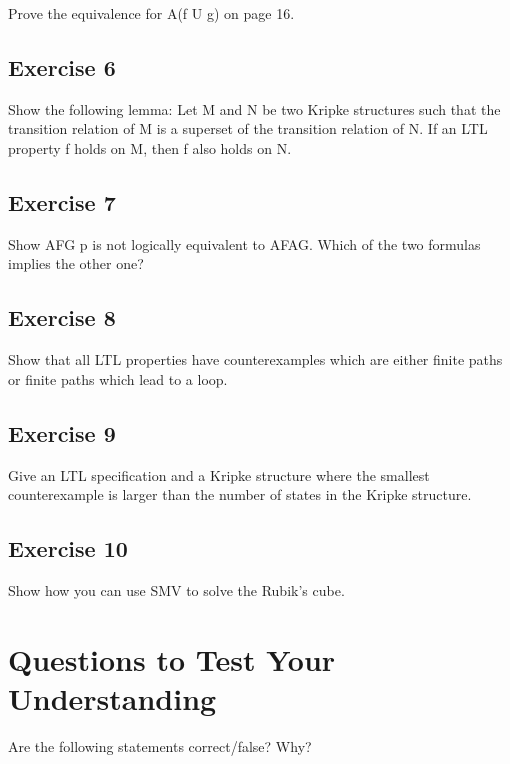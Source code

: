 \documentclass[a4paper, 11pt]{article}
\begin{document}
Prove the equivalence for A(f U g) on page 16.

\subsection{Exercise 6}

Show the following lemma: Let M and N be two Kripke structures such that the transition relation of M is a superset of the transition relation of N. If an LTL property f holds on M, then f also holds on N.

\subsection{Exercise 7}

Show AFG p is not logically equivalent to AFAG. Which of the two formulas implies the other one?

\subsection{Exercise 8}

Show that all LTL properties have counterexamples which are either finite paths or finite paths which lead to a loop.

\subsection{Exercise 9}

Give an LTL specification and a Kripke structure where the smallest counterexample is larger than the number of states in the Kripke structure.

\subsection{Exercise 10}

Show how you can use SMV to solve the Rubik’s cube.

\section{Questions to Test Your Understanding}

Are the following statements correct/false? Why?
\end{document}
